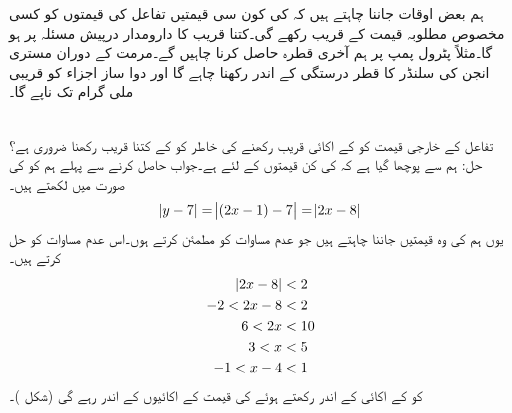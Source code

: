 ہم بعض اوقات جاننا چاہتے ہیں کہ  کی کون سی قیمتیں  تفاعل  کی قیمتوں کو کسی مخصوص مطلوبہ قیمت کے قریب رکھے گی۔کتنا قریب کا دارومدار درپیش مسئلہ پر ہو گا۔مثلاً پٹرول پمپ پر ہم آخری قطرہ حاصل کرنا چاہیں گے۔مرمت کے دوران  مستری انجن  کی  سلنڈر کا قطر  درستگی کے اندر رکھنا چاہے گا اور دوا ساز اجزاء کو قریبی ملی گرام تک ناپے گا۔

\\
تفاعل  کے خارجی قیمت کو  کے  اکائی قریب رکھنے کی خاطر  کو  کے کتنا قریب رکھنا ضروری ہے؟\\
حل:\quad
ہم سے پوچھا گیا ہے کہ  کی کن قیمتوں کے لئے  ہے۔جواب حاصل کرنے سے پہلے ہم   کو  کی صورت میں لکھتے ہیں۔
\begin{align*}
\abs{y-7}=\abs{(2x-1)-7}=\abs{2x-8}
\end{align*}
یوں ہم  کی وہ قیمتیں جاننا چاہتے ہیں جو عدم مساوات  کو مطمئن کرتے ہوں۔اس عدم مساوات کو حل کرتے ہیں۔
\begin{align*}
\abs{2x-8}&<2\\
-2<2x-8&<2\\
6<2x&<10\\
3<x&<5\\
-1<x-4&<1
\end{align*}
 کو  کے  اکائی کے اندر  رکھتے ہوئے  کی قیمت  کے  اکائیوں کے اندر رہے گی (شکل )۔
